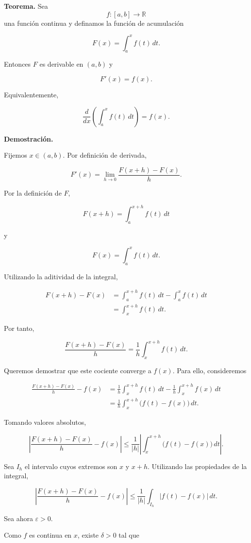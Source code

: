 \documentclass[12pt]{article}
\begin{document}
\textbf{Teorema.}
Sea
\[
f:[a,b]\longrightarrow\mathbb{R}
\]
una función continua y definamos la función de acumulación

\[
F(x)=\int_a^x f(t)\,dt.
\]

Entonces $F$ es derivable en $(a,b)$ y

\[
\boxed{
F'(x)=f(x).
}
\]

Equivalentemente,

\[
\boxed{
\frac{d}{dx}
\left(
\int_a^x f(t)\,dt
\right)
=f(x).
}
\]

\textbf{Demostración.}

Fijemos $x\in(a,b)$. Por definición de derivada,

\[
F'(x)
=
\lim_{h\to0}
\frac{F(x+h)-F(x)}{h}.
\]

Por la definición de $F$,

\[
F(x+h)=\int_a^{x+h}f(t)\,dt
\]

y

\[
F(x)=\int_a^x f(t)\,dt.
\]

Utilizando la aditividad de la integral,

\begin{align*}
F(x+h)-F(x)
&=
\int_a^{x+h}f(t)\,dt
-
\int_a^x f(t)\,dt\\
&=
\int_x^{x+h}f(t)\,dt.
\end{align*}

Por tanto,

\[
\frac{F(x+h)-F(x)}{h}
=
\frac{1}{h}
\int_x^{x+h}f(t)\,dt.
\]

Queremos demostrar que este cociente converge a $f(x)$. Para ello,
consideremos

\begin{align*}
\frac{F(x+h)-F(x)}{h}-f(x)
&=
\frac{1}{h}\int_x^{x+h}f(t)\,dt
-
\frac{1}{h}\int_x^{x+h}f(x)\,dt\\
&=
\frac{1}{h}
\int_x^{x+h}
\bigl(f(t)-f(x)\bigr)\,dt.
\end{align*}

Tomando valores absolutos,

\[
\left|
\frac{F(x+h)-F(x)}{h}-f(x)
\right|
\leq
\frac{1}{|h|}
\left|
\int_x^{x+h}
\bigl(f(t)-f(x)\bigr)\,dt
\right|.
\]

Sea $I_h$ el intervalo cuyos extremos son $x$ y $x+h$. Utilizando las
propiedades de la integral,

\[
\left|
\frac{F(x+h)-F(x)}{h}-f(x)
\right|
\leq
\frac{1}{|h|}
\int_{I_h}
|f(t)-f(x)|\,dt.
\]

Sea ahora $\varepsilon>0$.

Como $f$ es continua en $x$, existe $\delta>0$ tal que
\end{document}
